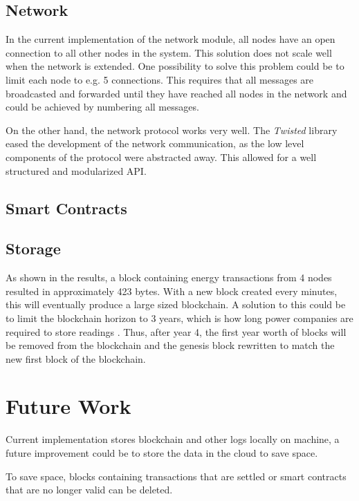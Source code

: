 \subsection*{Network}
In the current implementation of the network module, all nodes have an open connection to all other nodes in the system. This solution does not scale well when the network is extended. One possibility to solve this problem could be to limit each node to e.g. 5 connections. This requires that all messages are broadcasted and forwarded until they have reached all nodes in the network and could be achieved by numbering all messages. 

On the other hand, the network protocol works very well. The \textit{Twisted} library eased the development of the network communication, as the low level components of the protocol were abstracted away. This allowed for a well structured and  modularized API. 
 
\subsection*{Smart Contracts}


\subsection*{Storage}
As shown in the results, a block containing energy transactions from 4 nodes resulted in approximately 423 bytes. With a new block created every minutes, this will eventually produce a large sized blockchain. A solution to this could be to limit the blockchain horizon to 3 years, which is how long power companies are required to store readings \cite{store}. Thus, after year 4, the first year worth of blocks will be removed from the blockchain and the genesis block rewritten to match the new first block of the blockchain. 



\section{Future Work}\label{future}
Current implementation stores blockchain and other logs locally on machine, a future improvement could be to store the data in the cloud to save space.

To save space, blocks containing transactions that are settled or smart contracts that are no longer valid can be deleted. 

